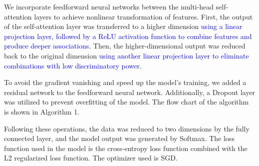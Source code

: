 \documentclass[a4paper]{cas-dc}
\begin{document}
We incorporate feedforward neural networks between the multi-head self-attention layers to achieve nonlinear transformation of features. First, the output of the self-attention layer was transferred to a higher dimension \textcolor{blue}{using a linear projection layer, followed by a ReLU activation function to combine features and produce deeper associations.} Then, the higher-dimensional output was reduced back to the original dimension \textcolor{blue}{using another linear projection layer to eliminate combinations with low discriminatory power.}

To avoid the gradient vanishing and speed up the model's training, we added a residual network to the feedforward neural network. Additionally, a Dropout layer was utilized to prevent overfitting of the model. The flow chart of the algorithm is shown in Algorithm 1.

Following these operations, the data was reduced to two dimensions by the fully connected layer, and the model output was generated by Softmax. The loss function used in the model is the cross-entropy loss function combined with the L2 regularized loss function. The optimizer used is SGD.
\end{document}
